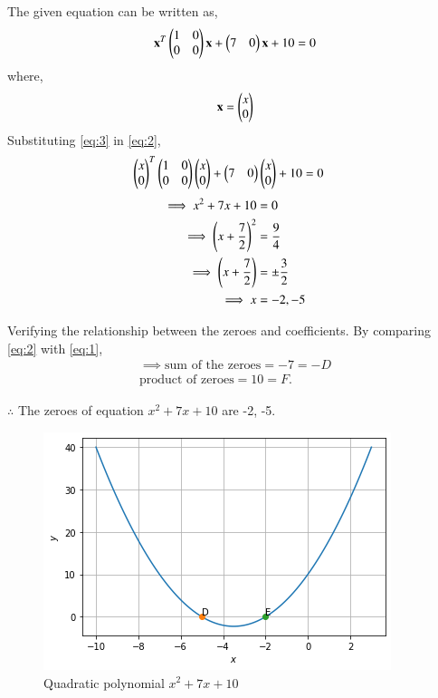 \documentclass[journal,12pt,twocolumn]{IEEEtran}
\begin{document}
The given equation can be written as,
\begin{align}
    \mathbf{x}^T\begin{pmatrix}1 & 0 \\ 0 & 0\end{pmatrix}\mathbf{x} + \begin{pmatrix}7 & 0\end{pmatrix}\mathbf{x} + 10 = 0 \label{eq:2}
\end{align}
where,
\begin{align}
    \mathbf{x} = \begin{pmatrix}x \\ 0\end{pmatrix} \label{eq:3}
\end{align}
Substituting \eqref{eq:3} in \eqref{eq:2},
\begin{align}
    \begin{pmatrix}x \\ 0\end{pmatrix}^T\begin{pmatrix}1 & 0 \\ 0 & 0\end{pmatrix}\begin{pmatrix}x \\ 0\end{pmatrix} + \begin{pmatrix}7 & 0\end{pmatrix}\begin{pmatrix}x \\ 0\end{pmatrix} + 10 &= 0 
\end{align}
\begin{align}
    \implies x^2 + 7x + 10 &= 0\\
    \implies \left(x + \frac{7}{2}\right)^2 &= \frac{9}{4}\\
    \implies \left(x + \frac{7}{2}\right) &= \pm\frac{3}{2}\label{eq:4}\\
    \implies x  &= -2,-5\label{eq:5}
\end{align}

Verifying the relationship between the zeroes and coefficients. By comparing \eqref{eq:2} with \eqref{eq:1},
\begin{align}
    \implies \text{sum of the zeroes} = -7 = -D\\
    \text{product of zeroes} = 10 = F.
\end{align}

$\therefore$ The zeroes of equation $x^2+7x+10$ are -2, -5.
\begin{figure}
    \centering
    \includegraphics[width=\columnwidth]{a_5.png}
    \caption{Quadratic polynomial $x^2+7x+10$}
    \label{fig:my_label}
\end{figure}
\end{document}
